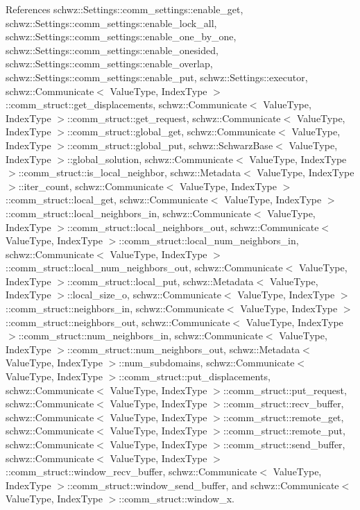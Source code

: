 References schwz\+::\+Settings\+::comm\+\_\+settings\+::enable\+\_\+get, schwz\+::\+Settings\+::comm\+\_\+settings\+::enable\+\_\+lock\+\_\+all, schwz\+::\+Settings\+::comm\+\_\+settings\+::enable\+\_\+one\+\_\+by\+\_\+one, schwz\+::\+Settings\+::comm\+\_\+settings\+::enable\+\_\+onesided, schwz\+::\+Settings\+::comm\+\_\+settings\+::enable\+\_\+overlap, schwz\+::\+Settings\+::comm\+\_\+settings\+::enable\+\_\+put, schwz\+::\+Settings\+::executor, schwz\+::\+Communicate$<$ Value\+Type, Index\+Type $>$\+::comm\+\_\+struct\+::get\+\_\+displacements, schwz\+::\+Communicate$<$ Value\+Type, Index\+Type $>$\+::comm\+\_\+struct\+::get\+\_\+request, schwz\+::\+Communicate$<$ Value\+Type, Index\+Type $>$\+::comm\+\_\+struct\+::global\+\_\+get, schwz\+::\+Communicate$<$ Value\+Type, Index\+Type $>$\+::comm\+\_\+struct\+::global\+\_\+put, schwz\+::\+Schwarz\+Base$<$ Value\+Type, Index\+Type $>$\+::global\+\_\+solution, schwz\+::\+Communicate$<$ Value\+Type, Index\+Type $>$\+::comm\+\_\+struct\+::is\+\_\+local\+\_\+neighbor, schwz\+::\+Metadata$<$ Value\+Type, Index\+Type $>$\+::iter\+\_\+count, schwz\+::\+Communicate$<$ Value\+Type, Index\+Type $>$\+::comm\+\_\+struct\+::local\+\_\+get, schwz\+::\+Communicate$<$ Value\+Type, Index\+Type $>$\+::comm\+\_\+struct\+::local\+\_\+neighbors\+\_\+in, schwz\+::\+Communicate$<$ Value\+Type, Index\+Type $>$\+::comm\+\_\+struct\+::local\+\_\+neighbors\+\_\+out, schwz\+::\+Communicate$<$ Value\+Type, Index\+Type $>$\+::comm\+\_\+struct\+::local\+\_\+num\+\_\+neighbors\+\_\+in, schwz\+::\+Communicate$<$ Value\+Type, Index\+Type $>$\+::comm\+\_\+struct\+::local\+\_\+num\+\_\+neighbors\+\_\+out, schwz\+::\+Communicate$<$ Value\+Type, Index\+Type $>$\+::comm\+\_\+struct\+::local\+\_\+put, schwz\+::\+Metadata$<$ Value\+Type, Index\+Type $>$\+::local\+\_\+size\+\_\+o, schwz\+::\+Communicate$<$ Value\+Type, Index\+Type $>$\+::comm\+\_\+struct\+::neighbors\+\_\+in, schwz\+::\+Communicate$<$ Value\+Type, Index\+Type $>$\+::comm\+\_\+struct\+::neighbors\+\_\+out, schwz\+::\+Communicate$<$ Value\+Type, Index\+Type $>$\+::comm\+\_\+struct\+::num\+\_\+neighbors\+\_\+in, schwz\+::\+Communicate$<$ Value\+Type, Index\+Type $>$\+::comm\+\_\+struct\+::num\+\_\+neighbors\+\_\+out, schwz\+::\+Metadata$<$ Value\+Type, Index\+Type $>$\+::num\+\_\+subdomains, schwz\+::\+Communicate$<$ Value\+Type, Index\+Type $>$\+::comm\+\_\+struct\+::put\+\_\+displacements, schwz\+::\+Communicate$<$ Value\+Type, Index\+Type $>$\+::comm\+\_\+struct\+::put\+\_\+request, schwz\+::\+Communicate$<$ Value\+Type, Index\+Type $>$\+::comm\+\_\+struct\+::recv\+\_\+buffer, schwz\+::\+Communicate$<$ Value\+Type, Index\+Type $>$\+::comm\+\_\+struct\+::remote\+\_\+get, schwz\+::\+Communicate$<$ Value\+Type, Index\+Type $>$\+::comm\+\_\+struct\+::remote\+\_\+put, schwz\+::\+Communicate$<$ Value\+Type, Index\+Type $>$\+::comm\+\_\+struct\+::send\+\_\+buffer, schwz\+::\+Communicate$<$ Value\+Type, Index\+Type $>$\+::comm\+\_\+struct\+::window\+\_\+recv\+\_\+buffer, schwz\+::\+Communicate$<$ Value\+Type, Index\+Type $>$\+::comm\+\_\+struct\+::window\+\_\+send\+\_\+buffer, and schwz\+::\+Communicate$<$ Value\+Type, Index\+Type $>$\+::comm\+\_\+struct\+::window\+\_\+x.

